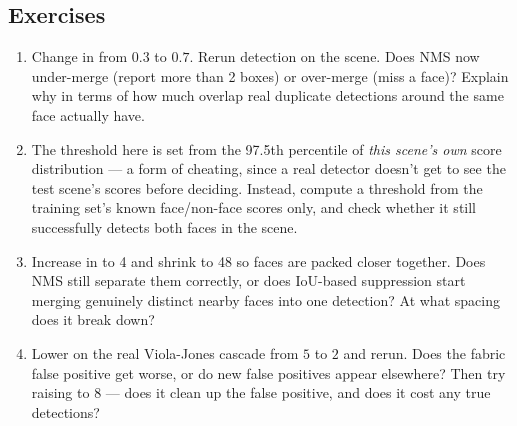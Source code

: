 \subsection*{Exercises}
\begin{enumerate}
  \item Change  in  from $0.3$ to $0.7$. Rerun detection on the scene. Does NMS now under-merge (report more than 2 boxes) or over-merge (miss a face)? Explain why in terms of how much overlap real duplicate detections around the same face actually have.
  \item The threshold here is set from the 97.5th percentile of \emph{this scene's own} score distribution --- a form of cheating, since a real detector doesn't get to see the test scene's scores before deciding. Instead, compute a threshold from the training set's known face/non-face scores only, and check whether it still successfully detects both faces in the scene.
  \item Increase  in  to 4 and shrink  to 48 so faces are packed closer together. Does NMS still separate them correctly, or does IoU-based suppression start merging genuinely distinct nearby faces into one detection? At what spacing does it break down?
  \item Lower  on the real Viola-Jones cascade from $5$ to $2$ and rerun. Does the fabric false positive get worse, or do new false positives appear elsewhere? Then try raising  to $8$ --- does it clean up the false positive, and does it cost any true detections?
\end{enumerate}

\vfill
{}
